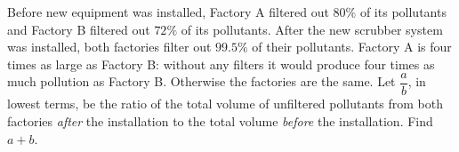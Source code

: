 Before new equipment was installed, Factory A filtered out $80\%$ of its pollutants and Factory B filtered out $72\%$ of its pollutants. After the new scrubber system was installed, both factories filter out $99.5\%$ of their pollutants. Factory A is four times as large as Factory B: without any filters it would produce four times as much pollution as Factory B. Otherwise the factories are the same. Let $\dfrac {a}{b}$, in lowest terms, be the ratio of the total volume of unfiltered pollutants from both factories \emph{after} the installation to the total volume \emph{before} the installation. Find $a+b$.
